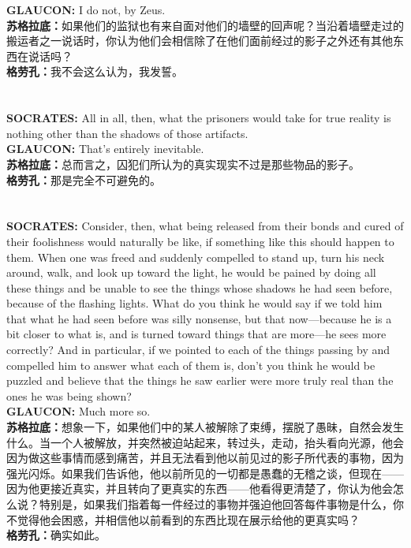 \documentclass{article}
\begin{document}
\textbf{GLAUCON: }I do not, by Zeus.\\
\textbf{苏格拉底：}如果他们的监狱也有来自面对他们的墙壁的回声呢？当沿着墙壁走过的搬运者之一说话时，你认为他们会相信除了在他们面前经过的影子之外还有其他东西在说话吗？\\
\textbf{格劳孔：}我不会这么认为，我发誓。\\
\\\\
\textbf{SOCRATES: }All in all, then, what the prisoners would take for true reality is nothing other than the shadows of those artifacts.\\
\textbf{GLAUCON: }That's entirely inevitable.\\
\textbf{苏格拉底：}总而言之，囚犯们所认为的真实现实不过是那些物品的影子。\\
\textbf{格劳孔：}那是完全不可避免的。\\
\\\\
\textbf{SOCRATES: }Consider, then, what being released from their bonds and cured of their foolishness would naturally be like, if something like this should happen to them. When one was freed and suddenly compelled to stand up, turn his neck around, walk, and look up toward the light, he would be pained by doing all these things and be unable to see the things whose shadows he had seen before, because of the flashing lights. What do you think he would say if we told him that what he had seen before was silly nonsense, but that now—because he is a bit closer to what is, and is turned toward things that are more—he sees more correctly? And in particular, if we pointed to each of the things passing by and compelled him to answer what each of them is, don’t you think he would be puzzled and believe that the things he saw earlier were more truly real than the ones he was being shown?\\
\textbf{GLAUCON:} Much more so.\\
\textbf{苏格拉底：}想象一下，如果他们中的某人被解除了束缚，摆脱了愚昧，自然会发生什么。当一个人被解放，并突然被迫站起来，转过头，走动，抬头看向光源，他会因为做这些事情而感到痛苦，并且无法看到他以前见过的影子所代表的事物，因为强光闪烁。如果我们告诉他，他以前所见的一切都是愚蠢的无稽之谈，但现在——因为他更接近真实，并且转向了更真实的东西——他看得更清楚了，你认为他会怎么说？特别是，如果我们指着每一件经过的事物并强迫他回答每件事物是什么，你不觉得他会困惑，并相信他以前看到的东西比现在展示给他的更真实吗？\\
\textbf{格劳孔：}确实如此。\\
\end{document}
